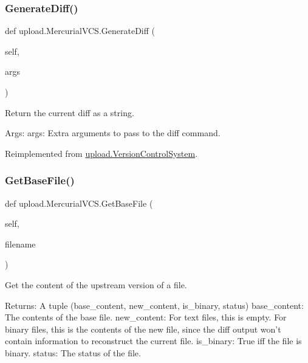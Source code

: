 \subsubsection{\texorpdfstring{GenerateDiff()}{GenerateDiff()}\hspace{0.1cm}{\footnotesize\ttfamily [2/2]}}
{\footnotesize\ttfamily def upload.\+Mercurial\+V\+C\+S.\+Generate\+Diff (\begin{DoxyParamCaption}\item[{}]{self,  }\item[{}]{args }\end{DoxyParamCaption})}

\begin{DoxyVerb}Return the current diff as a string.

Args:
  args: Extra arguments to pass to the diff command.
\end{DoxyVerb}
 

Reimplemented from \mbox{\hyperlink{classupload_1_1VersionControlSystem_aa5eb260c96e7016dab36b5fc136c9f49}{upload.\+Version\+Control\+System}}.

\mbox{\label{classupload_1_1MercurialVCS_a0cdc0cbe6ac4daab82f5f01e6ae2e670}} 
\subsubsection{\texorpdfstring{GetBaseFile()}{GetBaseFile()}\hspace{0.1cm}{\footnotesize\ttfamily [1/2]}}
{\footnotesize\ttfamily def upload.\+Mercurial\+V\+C\+S.\+Get\+Base\+File (\begin{DoxyParamCaption}\item[{}]{self,  }\item[{}]{filename }\end{DoxyParamCaption})}

\begin{DoxyVerb}Get the content of the upstream version of a file.

Returns:
  A tuple (base_content, new_content, is_binary, status)
base_content: The contents of the base file.
new_content: For text files, this is empty.  For binary files, this is
  the contents of the new file, since the diff output won't contain
  information to reconstruct the current file.
is_binary: True iff the file is binary.
status: The status of the file.
\end{DoxyVerb}
 


